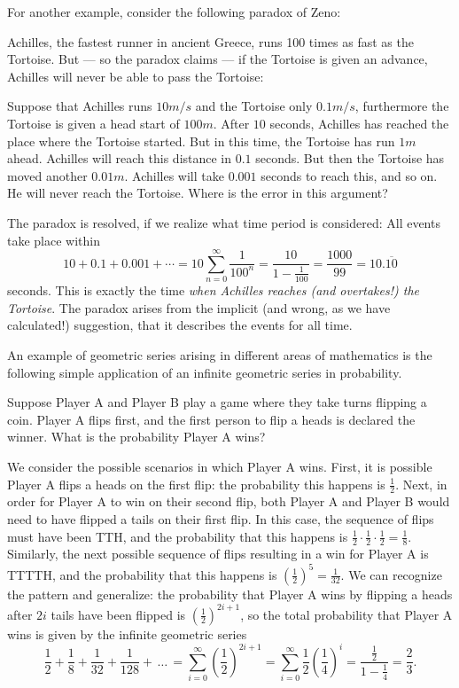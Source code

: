 For another example, consider the following paradox of Zeno:

Achilles, the fastest runner in ancient Greece, runs 100 times as
fast as the Tortoise. But --- so the paradox claims --- if the
Tortoise is given an advance, Achilles will never be able to pass
the Tortoise:

Suppose that Achilles runs
$10 m/s$ and the Tortoise only $0.1 m/s$, furthermore the Tortoise is given
a head start of $100m$.
After $10$ seconds, Achilles has reached the place where the Tortoise
started. But in this time, the Tortoise has run $1m$ ahead. Achilles will
reach this distance in $0.1$ seconds. But then the Tortoise has moved
another $0.01m$. Achilles will take $0.001$ seconds to reach this, and so
on. He will never reach the Tortoise. Where is the error in this argument?

The paradox is resolved, if we realize what time period is considered:
All events take place within
\[
10+0.1+0.001+\cdots=10\sum_{n=0}^\infty
\frac{1}{100^n}=\frac{10}{1-\frac{1}{100}}=\frac{1000}{99}=10.\overline{10}
\]
seconds. This is exactly the time {\em when Achilles reaches (and
overtakes!) the Tortoise}. The paradox arises from the implicit
(and wrong, as we have calculated!)
suggestion, that it describes the events for all time.
\bigskip

An example of geometric series arising in different areas of mathematics is
the following simple application of an infinite geometric series in probability.

Suppose Player A and Player B play a game where they take turns flipping a coin.
Player A flips first, and the first person to flip a heads is declared the winner.
What is the probability Player A wins?

We consider the possible scenarios in which Player A wins.
First, it is possible Player A flips a heads on the first flip: the probability this happens is $\frac{1}{2}$.
Next, in order for Player A to win on their second flip, both Player A and Player B would need to have flipped a tails on their first flip.
In this case, the sequence of flips must have been TTH, and the probability that this happens is $\frac{1}{2} \cdot \frac{1}{2} \cdot \frac{1}{2} = \frac{1}{8}$.
Similarly, the next possible sequence of flips resulting in a win for Player A is TTTTH, and the probability that this happens is $\left( \frac{1}{2} \right)^5 = \frac{1}{32}$.
We can recognize the pattern and generalize: the probability that Player A wins by flipping a heads after $2i$ tails have been flipped is $\left( \frac{1}{2} \right)^{2i+1}$, so the total probability that Player A wins is given by the infinite geometric series
\[\frac{1}{2} + \frac{1}{8} + \frac{1}{32} + \frac{1}{128} + \, \dots \,  = \sum_{i=0}^\infty \left( \frac{1}{2} \right)^{2i+1} = \sum_{i=0}^\infty \frac{1}{2} \left( \frac{1}{4} \right)^i = \frac{\frac{1}{2}}{1-\frac{1}{4}} = \frac{2}{3}.
\]

